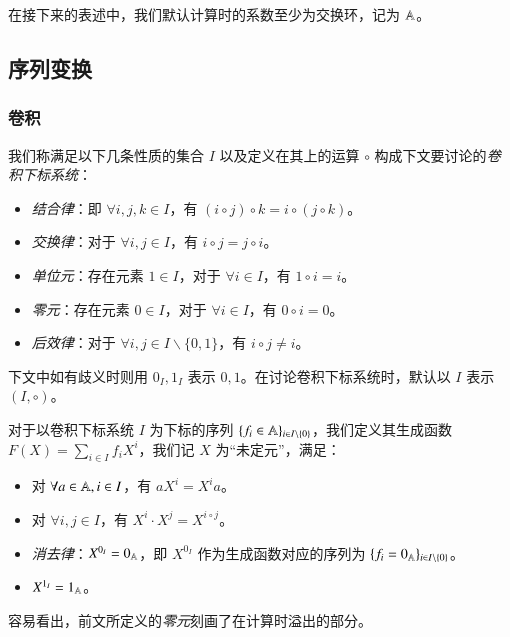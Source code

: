 在接下来的表述中，我们默认计算时的系数至少为交换环，记为 $\mathbb A$。

\subsection{序列变换}

\subsubsection{卷积}

\begin{definition} [卷积下标系统]
我们称满足以下几条性质的集合 $I$ 以及定义在其上的运算 $\circ$ 构成下文要讨论的\emph{卷积下标系统}：
\begin{itemize}
\item \emph{结合律}：即 $\forall i,j,k\in I$，有 $(i\circ j)\circ k = i\circ(j\circ k)$。
\item \emph{交换律}：对于 $\forall i,j\in I$，有 $i\circ j = j\circ i$。
\item \emph{单位元}：存在元素 $1 \in I$，对于 $\forall i\in I$，有 $1\circ i = i$。
\item \emph{零元}：存在元素 $0\in I$，对于 $\forall i\in I$，有 $0\circ i = 0$。
\item \emph{后效律}：对于 $\forall i,j\in I\backslash \{0,1\}$，有 $i\circ j \neq i$。
\end{itemize}
下文中如有歧义时则用 $0_I, 1_I$ 表示 $0,1$。在讨论卷积下标系统时，默认以 $I$ 表示 $(I, \circ)$。
\end{definition}

\begin{definition} [生成函数]
对于以卷积下标系统 $I$ 为下标的序列 $\{f_i \in \mathbb A\}_{i\in {I \backslash \{0\}}}$，我们定义其生成函数 $F(X) = \sum_{i\in I} f_i X^i$，我们记 $X$ 为“未定元”，满足：

\begin{itemize}
\item 对 $\forall a\in \mathbb A, i\in I$，有 $aX^i = X^i a$。
\item 对 $\forall i,j\in I$，有 $X^i \cdot X^j = X^{i\circ j}$。
\item \emph{消去律}：$X^{0_I} = 0_{\mathbb A}$，即 $X^{0_I}$ 作为生成函数对应的序列为 $\{f_i = 0_{\mathbb A}\}_{i\in {I \backslash \{0\}}}$。
\item $X^{1_I} = 1_{\mathbb A}$。
\end{itemize}

\end{definition}

容易看出，前文所定义的\emph{零元}刻画了在计算时溢出的部分。

